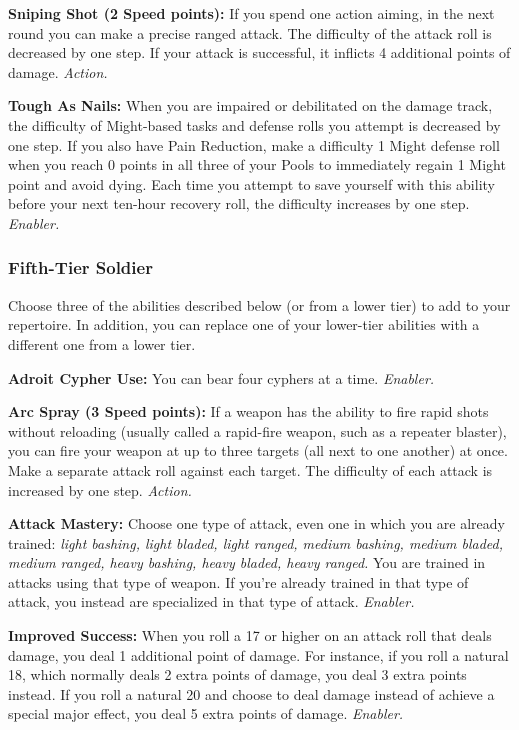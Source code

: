 \documentclass[a4paper,10pt,final,twocolumn,oneside]{book}
\newcommand{\itemAbility}[2]{\textcolor{25gray}{\textbullet\textbf{ #1:}}{ #2}\par}
\newcommand{\enabler}{\textit{ Enabler.}}
\newcommand{\action}{\textit{ Action.}}
\begin{document}
\itemAbility{Sniping Shot (2 Speed points)}{If you spend one action aiming, in the next round you can make a precise ranged attack. The difficulty of the attack roll is decreased by one step. If your attack is successful, it inflicts 4 additional points of damage.\action}

\itemAbility{Tough As Nails}{When you are impaired or debilitated on the damage track, the difficulty of Might-based tasks and defense rolls you attempt is decreased by one step. If you also have Pain Reduction, make a difficulty 1 Might defense roll when you reach 0 points in all three of your Pools to immediately regain 1 Might point and avoid dying. Each time you attempt to save yourself with this ability before your next ten-hour recovery roll, the difficulty increases by one step.\enabler}


\subsubsection*{Fifth-Tier Soldier}
\label{subsub:soldierFifthTier}

Choose three of the abilities described below (or from a lower tier) to add to your repertoire. In addition, you can replace one of your lower-tier abilities with a different one from a lower tier.

\itemAbility{Adroit Cypher Use}{You can bear four cyphers at a time.\enabler}

\itemAbility{Arc Spray (3 Speed points)}{If a weapon has the ability to fire rapid shots without reloading (usually called a rapid-fire weapon, such as a repeater blaster), you can fire your weapon at up to three targets (all next to one another) at once. Make a separate attack roll against each target. The difficulty of each attack is increased by one step.\action}

\itemAbility{Attack Mastery}{Choose one type of attack, even one in which you are already trained: \textit{light bashing, light bladed, light ranged, medium bashing, medium bladed, medium ranged, heavy bashing, heavy bladed, heavy ranged.} You are trained in attacks using that type of weapon. If you’re already trained in that type of attack, you instead are specialized in that type of attack.\enabler}

\itemAbility{Improved Success}{When you roll a 17 or higher on an attack roll that deals damage, you deal 1 additional point of damage. For instance, if you roll a natural 18, which normally deals 2 extra points of damage, you deal 3 extra points instead. If you roll a natural 20 and choose to deal damage instead of achieve a special major effect, you deal 5 extra points of damage.\enabler}
\end{document}
